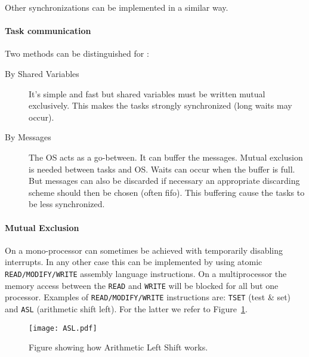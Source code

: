 Other synchronizations can be implemented in a similar way.

\paragraph{Task communication}
Two methods can be distinguished for :
\begin{description}
	\item[By Shared Variables] It's simple and fast but shared variables must be written mutual exclusively. This makes the tasks strongly synchronized (long waits may occur).
	\item[By Messages] The OS acts as a go-between. It can buffer the messages. Mutual exclusion is needed between tasks and OS. Waits can occur when the buffer is full. But messages can also be discarded if necessary an appropriate discarding scheme should then be chosen (often fifo). This buffering cause the tasks to be less synchronized.
\end{description} 


\paragraph{Mutual Exclusion}
On a mono-processor  can sometimes be achieved with temporarily disabling interrupts.
In any other case this can be implemented by using atomic \texttt{READ/MODIFY/WRITE} assembly language instructions.
On a multiprocessor the memory access between the \texttt{READ} and \texttt{WRITE} will be blocked for all but one processor.
Examples of \texttt{READ/MODIFY/WRITE} instructions are: \texttt{TSET} (test \& set) and \texttt{ASL} (arithmetic shift left). 
For the latter we refer to Figure~\ref{f:asl}. 

\begin{figure}
	\centering
	\texttt{[image: ASL.pdf]}
	\caption{Figure showing how Arithmetic Left Shift works.}
	\label{f:asl}
\end{figure}

